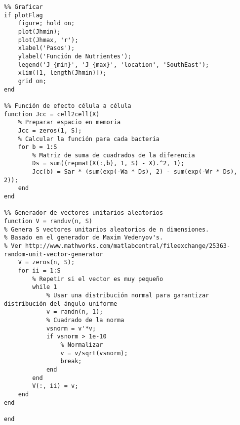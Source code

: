 \begin{scriptsize}
\begin{verbatim}
%% Graficar
if plotFlag
    figure; hold on;
    plot(Jhmin);
    plot(Jhmax, 'r');
    xlabel('Pasos');
    ylabel('Función de Nutrientes');
    legend('J_{min}', 'J_{max}', 'location', 'SouthEast');
    xlim([1, length(Jhmin)]);
    grid on;
end

%% Función de efecto célula a célula
function Jcc = cell2cell(X)
    % Preparar espacio en memoria
    Jcc = zeros(1, S);
    % Calcular la función para cada bacteria
    for b = 1:S
        % Matriz de suma de cuadrados de la diferencia
        Ds = sum((repmat(X(:,b), 1, S) - X).^2, 1);
        Jcc(b) = Sar * (sum(exp(-Wa * Ds), 2) - sum(exp(-Wr * Ds), 2));
    end
end

%% Generador de vectores unitarios aleatorios
function V = randuv(n, S)
% Genera S vectores unitarios aleatorios de n dimensiones.
% Basado en el generador de Maxim Vedenyov's.
% Ver http://www.mathworks.com/matlabcentral/fileexchange/25363-random-unit-vector-generator
    V = zeros(n, S);
    for ii = 1:S
        % Repetir si el vector es muy pequeño
        while 1
            % Usar una distribución normal para garantizar distribución del ángulo uniforme
            v = randn(n, 1);
            % Cuadrado de la norma
            vsnorm = v'*v;
            if vsnorm > 1e-10
                % Normalizar
                v = v/sqrt(vsnorm);
                break;
            end
        end
        V(:, ii) = v;
    end
end

end
\end{verbatim}
\end{scriptsize}